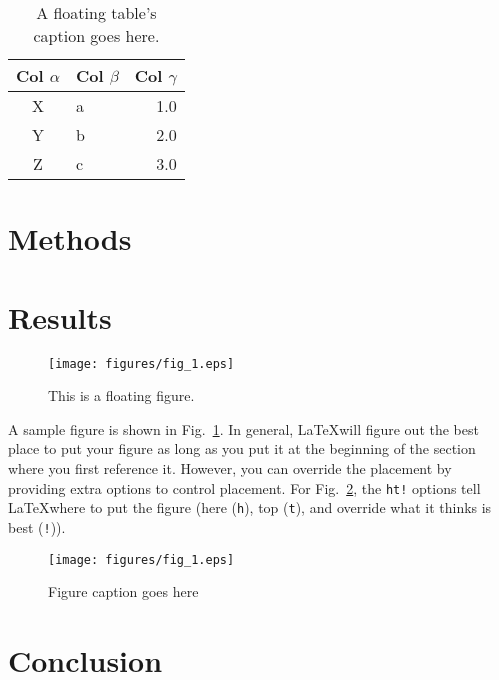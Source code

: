 \documentclass{ndreureport}
\begin{document}
\begin{table}[t]
    \centering
    \begin{tabular}{c|lr}
        Col $\alpha$ & Col $\beta$ & Col $\gamma$ \\ \hline
        X & a & 1.0 \\
        Y & b & 2.0 \\
        Z & c & 3.0
    \end{tabular}
    \caption{\label{tab:test}A floating table's caption goes here.}
\end{table}

\lipsum[5][1-3]

\section{Methods}

\lipsum[6]

\section{Results}

\begin{figure}
    \centering
    \texttt{[image: figures/fig\_1.eps]}
    \caption{\label{fig:float}This is a floating figure.}
\end{figure}

A sample figure is shown in Fig.~\ref{fig:float}. In general, \LaTeX will figure
out the best place to put your figure as long as you put it at the beginning of
the section where you first reference it. However, you can override the
placement by providing extra options to control placement. For
Fig.~\ref{fig:test}, the \texttt{ht!} options tell \LaTeX where to put the
figure (here (\texttt{h}), top (\texttt{t}), and override what it thinks is best
(\texttt{!})).
\begin{figure}[ht!]
    \centering
    \texttt{[image: figures/fig\_1.eps]}
    \caption{\label{fig:test}Figure caption goes here}
\end{figure}

\lipsum[6]

\section{Conclusion}

\lipsum[8]


\end{document}
